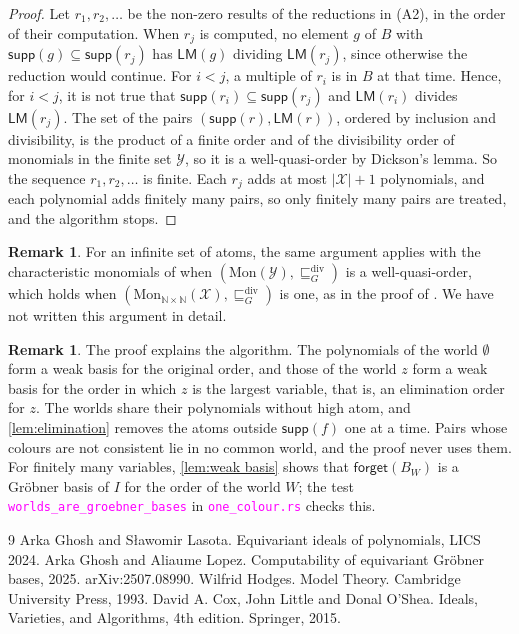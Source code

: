 \documentclass[12pt,a4paper,article]{memoir}
\newcommand{\struct}{\mathcal{X}}
\newcommand{\N}{\mathbb{N}}
\newcommand{\code}[1]{\texttt{\textcolor{magenta}{#1}}}
\newcommand{\supp}{\mathsf{supp}}
\newcommand{\LM}{\mathsf{LM}}
\newcommand{\forget}{\mathsf{forget}}
\theoremstyle{definition}
\newtheorem{remark}[theorem]{Remark}
\begin{document}
\begin{proof}
Let $r_1, r_2, \dots$ be the non-zero results of the reductions in (A2), in the order of their computation.
When $r_j$ is computed, no element $g$ of $B$ with $\supp(g) \subseteq \supp(r_j)$ has $\LM(g)$ dividing $\LM(r_j)$,
since otherwise the reduction would continue.
For $i < j$, a multiple of $r_i$ is in $B$ at that time.
Hence, for $i < j$, it is not true that $\supp(r_i) \subseteq \supp(r_j)$ and $\LM(r_i)$ divides $\LM(r_j)$.
The set of the pairs $(\supp(r), \LM(r))$, ordered by inclusion and divisibility,
is the product of a finite order and of the divisibility order of monomials in the finite set $\mathcal{Y}$,
so it is a well-quasi-order by Dickson's lemma.
So the sequence $r_1, r_2, \dots$ is finite.
Each $r_j$ adds at most $|\struct| + 1$ polynomials, and each polynomial adds finitely many pairs,
so only finitely many pairs are treated, and the algorithm stops.
\end{proof}

\begin{remark}
For an infinite set of atoms, the same argument applies with the characteristic monomials of \cite[Lemma 23]{GL25}
when $(\mathrm{Mon}(\mathcal{Y}), \sqsubseteq^{\mathrm{div}}_G)$ is a well-quasi-order,
which holds when $(\mathrm{Mon}_{\N \times \N}(\struct), \sqsubseteq^{\mathrm{div}}_G)$ is one, as in the proof of \cite[Lemma 26]{GL25}.
We have not written this argument in detail.
\end{remark}

\begin{remark}
The proof explains the algorithm.
The polynomials of the world $\emptyset$ form a weak basis for the original order,
and those of the world $z$ form a weak basis for the order in which $z$ is the largest variable,
that is, an elimination order for $z$.
The worlds share their polynomials without high atom,
and \cref{lem:elimination} removes the atoms outside $\supp(f)$ one at a time.
Pairs whose colours are not consistent lie in no common world, and the proof never uses them.
For finitely many variables, \cref{lem:weak basis} shows that $\forget(B_W)$ is a Gr\"{o}bner basis of $I$
for the order of the world $W$; the test \code{worlds\_are\_groebner\_bases} in \code{one\_colour.rs} checks this.
\end{remark}
%
\begin{thebibliography}{9}
Arka Ghosh and S\l{}awomir Lasota. Equivariant ideals of polynomials, LICS 2024.
%
Arka Ghosh and Aliaume Lopez. Computability of equivariant
Gr\"{o}bner bases, 2025. arXiv:2507.08990.
%
Wilfrid Hodges. Model Theory. Cambridge University Press, 1993.
%
David A. Cox, John Little and Donal O'Shea. Ideals, Varieties, and Algorithms, 4th edition. Springer, 2015.
%
\end{thebibliography}
%
\end{document}
